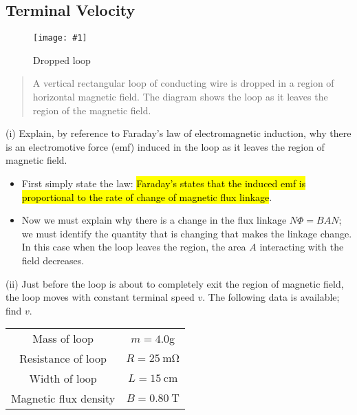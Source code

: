 \documentclass[a4paper,12pt]{article}
\newcommand{\img}[4]{\begin{center}
  \begin{figure}[H]
    \centering
    \texttt{[image: \#1]}
    \caption{#3}
    \label{fig:#4}
  \end{figure}
\end{center}}
\begin{document}
\subsection{Terminal Velocity}
\img{ex/droppedloop.png}{0.45}{Dropped loop}{droppedloop}
\begin{quote}
  A vertical rectangular loop of conducting wire is dropped in a region of horizontal magnetic field. The diagram shows the loop as it leaves the region of the magnetic field.
\end{quote}
(i) Explain, by reference to Faraday's law of electromagnetic induction, why there is an electromotive force (emf) induced in the loop as it leaves the region of magnetic field.
\begin{itemize}
  \item First simply state the law: \hl{Faraday's states that the induced emf is proportional to the rate of change of magnetic flux linkage}.
  \item Now we must explain why there is a change in the flux linkage $N\Phi = BAN$; we must identify the quantity that is changing that makes the linkage change. In this case when the loop leaves the region, the area $A$ interacting with the field decreases.
\end{itemize}
(ii) Just before the loop is about to completely exit the region of magnetic field, the loop moves with constant terminal speed $v$. The following data is available; find $v$.
\begin{table}[H]
  \centering
  \begin{tabular}{|c|c|}
    \hline
    Mass of loop          & $m = 4.0$g                                       \\
    Resistance of loop    & $R = \SI{25}{\milli\ohm}$                        \\
    Width of loop         & $L = \SI{15}{\centi\metre}$                      \\
    Magnetic flux density & $                         B = \SI{0.80}{\tesla}$ \\
    \hline
  \end{tabular}
\end{table}
\end{document}
